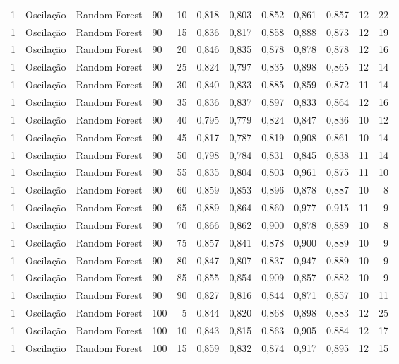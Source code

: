 \begin{longtable}{ccclrrrrrrrr}
1 & Oscilação & Random Forest & 90 & 10 & 0,818 & 0,803 & 0,852 & 0,861 & 0,857 & 12 & 22 \\
1 & Oscilação & Random Forest & 90 & 15 & 0,836 & 0,817 & 0,858 & 0,888 & 0,873 & 12 & 19 \\
1 & Oscilação & Random Forest & 90 & 20 & 0,846 & 0,835 & 0,878 & 0,878 & 0,878 & 12 & 16 \\
1 & Oscilação & Random Forest & 90 & 25 & 0,824 & 0,797 & 0,835 & 0,898 & 0,865 & 12 & 14 \\
1 & Oscilação & Random Forest & 90 & 30 & 0,840 & 0,833 & 0,885 & 0,859 & 0,872 & 11 & 14 \\
1 & Oscilação & Random Forest & 90 & 35 & 0,836 & 0,837 & 0,897 & 0,833 & 0,864 & 12 & 16 \\
1 & Oscilação & Random Forest & 90 & 40 & 0,795 & 0,779 & 0,824 & 0,847 & 0,836 & 10 & 12 \\
1 & Oscilação & Random Forest & 90 & 45 & 0,817 & 0,787 & 0,819 & 0,908 & 0,861 & 10 & 14 \\
1 & Oscilação & Random Forest & 90 & 50 & 0,798 & 0,784 & 0,831 & 0,845 & 0,838 & 11 & 14 \\
1 & Oscilação & Random Forest & 90 & 55 & 0,835 & 0,804 & 0,803 & 0,961 & 0,875 & 11 & 10 \\
1 & Oscilação & Random Forest & 90 & 60 & 0,859 & 0,853 & 0,896 & 0,878 & 0,887 & 10 & 8 \\
1 & Oscilação & Random Forest & 90 & 65 & 0,889 & 0,864 & 0,860 & 0,977 & 0,915 & 11 & 9 \\
1 & Oscilação & Random Forest & 90 & 70 & 0,866 & 0,862 & 0,900 & 0,878 & 0,889 & 10 & 8 \\
1 & Oscilação & Random Forest & 90 & 75 & 0,857 & 0,841 & 0,878 & 0,900 & 0,889 & 10 & 9 \\
1 & Oscilação & Random Forest & 90 & 80 & 0,847 & 0,807 & 0,837 & 0,947 & 0,889 & 10 & 9 \\
1 & Oscilação & Random Forest & 90 & 85 & 0,855 & 0,854 & 0,909 & 0,857 & 0,882 & 10 & 9 \\
1 & Oscilação & Random Forest & 90 & 90 & 0,827 & 0,816 & 0,844 & 0,871 & 0,857 & 10 & 11 \\
1 & Oscilação & Random Forest & 100 & 5 & 0,844 & 0,820 & 0,868 & 0,898 & 0,883 & 12 & 25 \\
1 & Oscilação & Random Forest & 100 & 10 & 0,843 & 0,815 & 0,863 & 0,905 & 0,884 & 12 & 17 \\
1 & Oscilação & Random Forest & 100 & 15 & 0,859 & 0,832 & 0,874 & 0,917 & 0,895 & 12 & 15 \\

\end{longtable}
